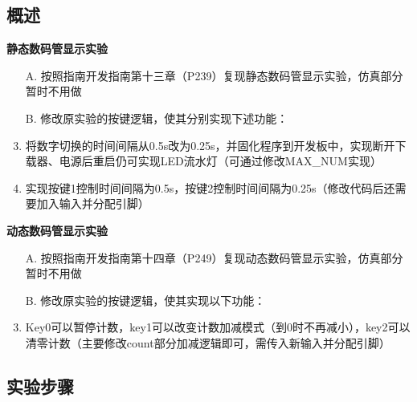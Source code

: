 \documentclass[UTF8]{article}
\theoremstyle{MyLineTheoremStyle} %
\theoremstyle{MyBlockTheoremStyle} %
\theoremstyle{MySubsubsectionStyle} %
\begin{document}
\subsection{概述}
\textbf{静态数码管显示实验}
\begin{enumerate}
\item[A.] 按照指南开发指南第十三章（P239）复现静态数码管显示实验，仿真部分暂时不用做
\item[B.] 修改原实验的按键逻辑，使其分别实现下述功能：
\item 将数字切换的时间间隔从0.5s改为0.25s，并固化程序到开发板中，实现断开下载器、电源后重启仍可实现LED流水灯（可通过修改MAX\_NUM实现）
\item 实现按键1控制时间间隔为0.5s，按键2控制时间间隔为0.25s（修改代码后还需要加入输入并分配引脚）
\end{enumerate}

\textbf{动态数码管显示实验}
\begin{enumerate}
\item[A.] 按照指南开发指南第十四章（P249）复现动态数码管显示实验，仿真部分暂时不用做
\item[B.] 修改原实验的按键逻辑，使其实现以下功能：
\item Key0可以暂停计数，key1可以改变计数加减模式（到0时不再减小），key2可以清零计数（主要修改count部分加减逻辑即可，需传入新输入并分配引脚）
\end{enumerate}

\cleardoublepage

\subsection{实验步骤}
\end{document}
